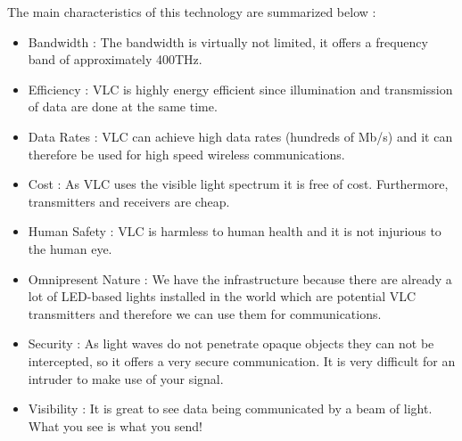 The main characteristics of this technology are summarized below \cite{r1}: 
\begin{itemize}
  \item Bandwidth :
The bandwidth is virtually not limited, it offers a frequency band of  approximately 400THz.
  \item Efficiency :
VLC is highly energy efficient since illumination and transmission of data are done at the same time.
  \item Data Rates :
VLC can achieve high data rates (hundreds of Mb/s) and it can therefore be used for high speed wireless communications.
  \item Cost :
As VLC uses the visible light spectrum it is free of cost. Furthermore, transmitters and receivers are cheap.
  \item Human Safety :
VLC is harmless to human health and it is not injurious to the human eye.
  \item Omnipresent Nature :
We have the infrastructure because there are already a lot of LED-based lights installed in the world which are potential VLC transmitters and therefore we can use them for communications.
  \item Security :
As light waves do not penetrate opaque objects they can not  be intercepted, so it offers a very secure communication. It is very difficult for an intruder to make use of your signal.
  \item Visibility :
It is great to see data being communicated by a beam of light. What you see is what you send!
\end{itemize}




